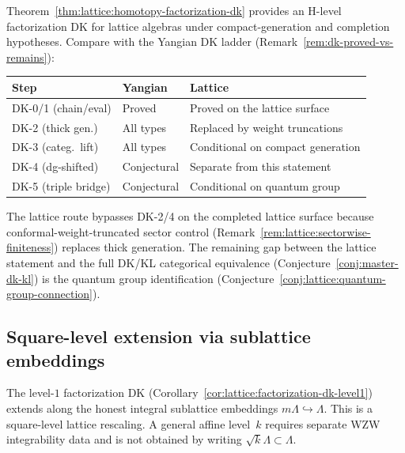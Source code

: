 \begin{remark}
\label{rem:lattice:comparison-yangian-dk}
Theorem~\ref{thm:lattice:homotopy-factorization-dk} provides an
H-level factorization DK for lattice algebras under compact-generation
and completion hypotheses.
Compare with the Yangian DK ladder
(Remark~\ref{rem:dk-proved-vs-remains}):
\begin{center}
\renewcommand{\arraystretch}{1.4}
\begin{tabular}{l l l}
\textbf{Step} & \textbf{Yangian} & \textbf{Lattice} \\
\hline
DK-0/1 (chain/eval) & Proved & Proved on the lattice surface \\
DK-2 (thick gen.) & All types & Replaced by weight truncations \\
DK-3 (categ.\ lift) & All types & Conditional on compact generation \\
DK-4 (dg-shifted) & Conjectural & Separate from this statement \\
DK-5 (triple bridge) & Conjectural & Conditional on quantum group \\
\end{tabular}
\end{center}
The lattice route bypasses DK-2/4 on the completed lattice surface
because conformal-weight-truncated sector control
(Remark~\ref{rem:lattice:sectorwise-finiteness}) replaces thick
generation. The remaining gap between the lattice statement and the
full DK/KL categorical equivalence (Conjecture~\ref{conj:master-dk-kl}) is the
quantum group identification
(Conjecture~\ref{conj:lattice:quantum-group-connection}).
\end{remark}


\subsection{Square-level extension via sublattice embeddings}

The level-$1$ factorization DK
(Corollary~\ref{cor:lattice:factorization-dk-level1}) extends along
the honest integral sublattice embeddings
$m\Lambda \hookrightarrow \Lambda$. This is a square-level lattice
rescaling. A general affine level~$k$ requires separate WZW
integrability data and is not obtained by writing
$\sqrt{k}\Lambda\subset\Lambda$.

